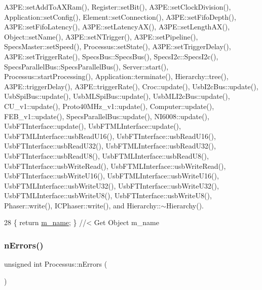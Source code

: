 A3\+P\+E\+::set\+Add\+To\+A\+X\+Ram(), Register\+::set\+Bit(), A3\+P\+E\+::set\+Clock\+Division(), Application\+::set\+Config(), Element\+::set\+Connection(), A3\+P\+E\+::set\+Fifo\+Depth(), A3\+P\+E\+::set\+Fifo\+Latency(), A3\+P\+E\+::set\+Latency\+A\+X(), A3\+P\+E\+::set\+Length\+A\+X(), Object\+::set\+Name(), A3\+P\+E\+::set\+N\+Trigger(), A3\+P\+E\+::set\+Pipeline(), Specs\+Master\+::set\+Speed(), Processus\+::set\+State(), A3\+P\+E\+::set\+Trigger\+Delay(), A3\+P\+E\+::set\+Trigger\+Rate(), Specs\+Bus\+::\+Specs\+Bus(), Specs\+I2c\+::\+Specs\+I2c(), Specs\+Parallel\+Bus\+::\+Specs\+Parallel\+Bus(), Server\+::start(), Processus\+::start\+Processing(), Application\+::terminate(), Hierarchy\+::tree(), A3\+P\+E\+::trigger\+Delay(), A3\+P\+E\+::trigger\+Rate(), Croc\+::update(), Usb\+I2c\+Bus\+::update(), Usb\+Spi\+Bus\+::update(), Usb\+M\+L\+Spi\+Bus\+::update(), Usb\+M\+L\+I2c\+Bus\+::update(), C\+U\+\_\+v1\+::update(), Proto40\+M\+Hz\+\_\+v1\+::update(), Computer\+::update(), F\+E\+B\+\_\+v1\+::update(), Specs\+Parallel\+Bus\+::update(), N\+I6008\+::update(), Usb\+F\+T\+Interface\+::update(), Usb\+F\+T\+M\+L\+Interface\+::update(), Usb\+F\+T\+M\+L\+Interface\+::usb\+Read\+U16(), Usb\+F\+T\+Interface\+::usb\+Read\+U16(), Usb\+F\+T\+Interface\+::usb\+Read\+U32(), Usb\+F\+T\+M\+L\+Interface\+::usb\+Read\+U32(), Usb\+F\+T\+Interface\+::usb\+Read\+U8(), Usb\+F\+T\+M\+L\+Interface\+::usb\+Read\+U8(), Usb\+F\+T\+Interface\+::usb\+Write\+Read(), Usb\+F\+T\+M\+L\+Interface\+::usb\+Write\+Read(), Usb\+F\+T\+Interface\+::usb\+Write\+U16(), Usb\+F\+T\+M\+L\+Interface\+::usb\+Write\+U16(), Usb\+F\+T\+M\+L\+Interface\+::usb\+Write\+U32(), Usb\+F\+T\+Interface\+::usb\+Write\+U32(), Usb\+F\+T\+M\+L\+Interface\+::usb\+Write\+U8(), Usb\+F\+T\+Interface\+::usb\+Write\+U8(), Phaser\+::write(), I\+C\+Phaser\+::write(), and Hierarchy\+::$\sim$\+Hierarchy().


\begin{DoxyCode}
28 \{ \textcolor{keywordflow}{return} \hyperlink{classObject_a8b83c95c705d2c3ba0d081fe1710f48d}{m\_name}; \} \textcolor{comment}{//< Get Object m\_name}
\end{DoxyCode}
\mbox{\label{classProcessus_a82a0487f82f07cc2c2dc2731f98149e7}} 
\subsubsection{\texorpdfstring{n\+Errors()}{nErrors()}}
{\footnotesize\ttfamily unsigned int Processus\+::n\+Errors (\begin{DoxyParamCaption}{ }\end{DoxyParamCaption})\hspace{0.3cm}{\ttfamily [inherited]}}


